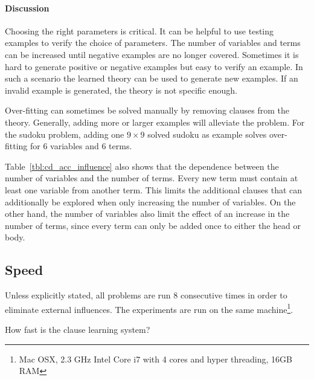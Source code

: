 \paragraph{Discussion}
	Choosing the right parameters is critical.
	It can be helpful to use testing examples to verify the choice of parameters.
	The number of variables and terms can be increased until negative examples are no longer covered.
	Sometimes it is hard to generate positive or negative examples but easy to verify an example.
	In such a scenario the learned theory can be used to generate new examples.
	If an invalid example is generated, the theory is not specific enough.

	Over-fitting can sometimes be solved manually by removing clauses from the theory.
	Generally, adding more or larger examples will alleviate the problem.
	For the sudoku problem, adding one $9 \times 9$ solved sudoku as example solves over-fitting for $6$ variables and $6$ terms.

	Table~\ref{tbl:cd_acc_influence} also shows that the dependence between the number of variables and the number of terms.
	Every new term must contain at least one variable from another term.
	This limits the additional clauses that can additionally be explored when only increasing the number of variables.
	On the other hand, the number of variables also limit the effect of an increase in the number of terms, since every term can only be added once to either the head or body.
\subsection{Speed}

Unless explicitly stated, all problems are run $8$ consecutive times in order to eliminate external influences.
The experiments are run on the same machine\footnote{Mac OSX, 2.3 GHz Intel Core i7 with 4 cores and hyper threading, 16GB RAM}.

\begin{question}
	How fast is the clause learning system?
\end{question}

